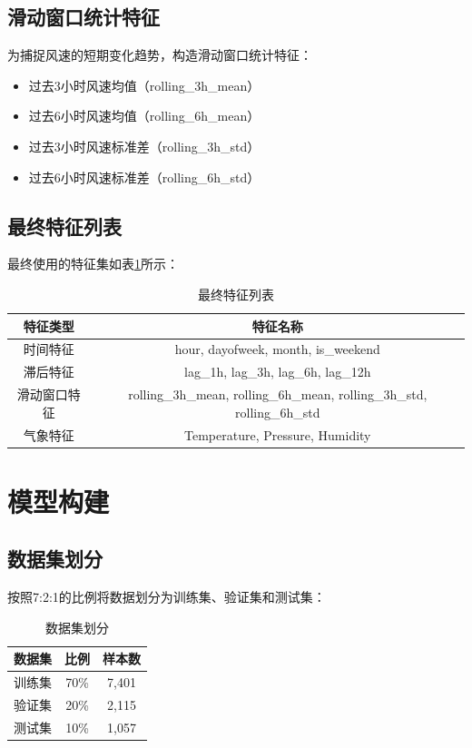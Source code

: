 \documentclass[12pt,a4paper]{article}
\begin{document}
\subsection{滑动窗口统计特征}
为捕捉风速的短期变化趋势，构造滑动窗口统计特征：
\begin{itemize}
    \item 过去3小时风速均值（rolling\_3h\_mean）
    \item 过去6小时风速均值（rolling\_6h\_mean）
    \item 过去3小时风速标准差（rolling\_3h\_std）
    \item 过去6小时风速标准差（rolling\_6h\_std）
\end{itemize}

\subsection{最终特征列表}
最终使用的特征集如表\ref{tab:features}所示：

\begin{table}[H]
\centering
\caption{最终特征列表}
\label{tab:features}
\begin{tabular}{c|c}
\hline
\textbf{特征类型} & \textbf{特征名称} \\
\hline
时间特征 & hour, dayofweek, month, is\_weekend \\
滞后特征 & lag\_1h, lag\_3h, lag\_6h, lag\_12h \\
滑动窗口特征 & rolling\_3h\_mean, rolling\_6h\_mean, rolling\_3h\_std, rolling\_6h\_std \\
气象特征 & Temperature, Pressure, Humidity \\
\hline
\end{tabular}
\end{table}

\newpage

\section{模型构建}

\subsection{数据集划分}
按照7:2:1的比例将数据划分为训练集、验证集和测试集：

\begin{table}[H]
\centering
\caption{数据集划分}
\label{tab:split}
\begin{tabular}{c|c|c}
\hline
\textbf{数据集} & \textbf{比例} & \textbf{样本数} \\
\hline
训练集 & 70\% & 7,401 \\
验证集 & 20\% & 2,115 \\
测试集 & 10\% & 1,057 \\
\hline
\end{tabular}
\end{table}
\end{document}
